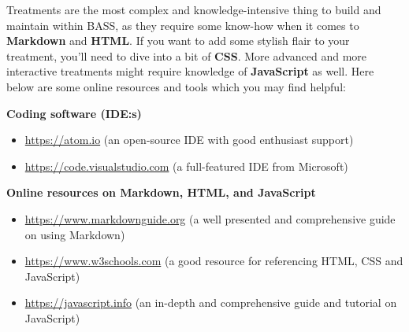 \documentclass[]{book}
\providecommand{\tightlist}{%
  \setlength{\itemsep}{0pt}\setlength{\parskip}{0pt}}
\begin{document}
Treatments are the most complex and knowledge-intensive thing to build and maintain within BASS, as they require some know-how when it comes to \textbf{Markdown} and \textbf{HTML}. If you want to add some stylish flair to your treatment, you'll need to dive into a bit of \textbf{CSS}.
More advanced and more interactive treatments might require knowledge of \textbf{JavaScript} as well. Here below are some online resources and tools which you may find helpful:

\textbf{Coding software (IDE:s)}

\begin{itemize}
\tightlist
\item
  \url{https://atom.io} (an open-source IDE with good enthusiast support)
\item
  \url{https://code.visualstudio.com} (a full-featured IDE from Microsoft)
\end{itemize}

\textbf{Online resources on Markdown, HTML, and JavaScript}

\begin{itemize}
\tightlist
\item
  \url{https://www.markdownguide.org} (a well presented and comprehensive guide on using Markdown)
\item
  \url{https://www.w3schools.com} (a good resource for referencing HTML, CSS and JavaScript)
\item
  \url{https://javascript.info} (an in-depth and comprehensive guide and tutorial on JavaScript)
\end{itemize}


\end{document}

